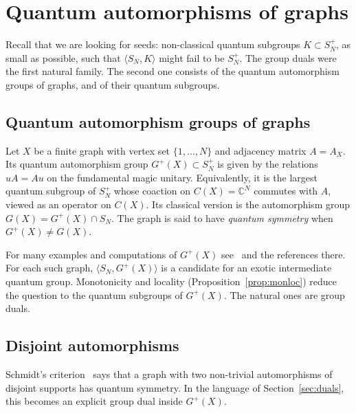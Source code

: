 \documentclass[11pt]{amsart}
\theoremstyle{definition}
\theoremstyle{remark}
\theoremstyle{plain}
\numberwithin{equation}{section}
\numberwithin{table}{section}
\newcommand{\C}{\mathbb C}
\begin{document}

\section{Quantum automorphisms of graphs}\label{sec:graphs}

Recall that we are looking for seeds: non-classical quantum subgroups $K\subset S_N^+$, as small as possible, such that $\langle S_N,K\rangle$ might fail to be $S_N^+$. The group duals were the first natural family. The second one consists of the quantum automorphism groups of graphs, and of their quantum subgroups.

\subsection{Quantum automorphism groups of graphs}

Let $X$ be a finite graph with vertex set $\{1,\dots,N\}$ and adjacency matrix $A=A_X$. Its quantum automorphism group $G^+(X)\subset S_N^+$ is given by the relations $uA=Au$ on the fundamental magic unitary. Equivalently, it is the largest quantum subgroup of $S_N^+$ whose coaction on $C(X)=\C^N$ commutes with $A$, viewed as an operator on $C(X)$. Its classical version is the automorphism group $G(X)=G^+(X)\cap S_N$. The graph is said to have \emph{quantum symmetry} when $G^+(X)\ne G(X)$.

For many examples and computations of $G^+(X)$ see~\cite{sz,sch2} and the references there. For each such graph, $\langle S_N,G^+(X)\rangle$ is a candidate for an exotic intermediate quantum group. Monotonicity and locality (Proposition~\ref{prop:monloc}) reduce the question to the quantum subgroups of $G^+(X)$. The natural ones are group duals.

\subsection{Disjoint automorphisms}

Schmidt's criterion~\cite{sch} says that a graph with two non-trivial automorphisms of disjoint supports has quantum symmetry. In the language of Section~\ref{sec:duals}, this becomes an explicit group dual inside $G^+(X)$.
\end{document}
